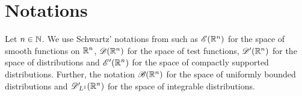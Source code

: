\section{Notations}
\label{not}

Let $ n \in \mathbb{ N } $.
We use Schwartz' notations from \cite{schw66}
such as $ \mathscr{  E  }(\mathbb{ R }^n) $ for the space of smooth functions on $ \mathbb{ R }^n $,
$ \mathscr{  D  }(\mathbb{ R }^n) $ for the space of test functions,
$ \mathscr{  D  }'(\mathbb{ R }^n) $ for the space of distributions
and $ \mathscr{  E  }'(\mathbb{ R }^n) $ for the space of compactly supported distributions.
Further, the notation $ \mathscr{  B  }(\mathbb{ R }^n) $ for the space
of uniformly bounded distributions and $ \mathscr{  D  }'\hspace{-2pt}{}_{ L^{ 1 } }(\mathbb{ R }^n) $
for the space of integrable distributions.